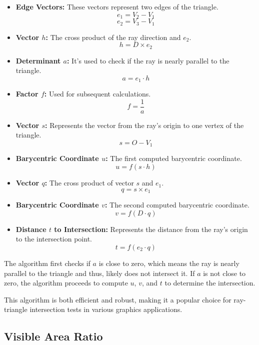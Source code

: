 \documentclass[11pt, a4paper,oneside,chapterprefix=false]{scrbook}
\begin{document}
\begin{itemize}
    \item \textbf{Edge Vectors:} These vectors represent two edges of the triangle.
	\[ e_1 = V_2 - V_1 \]
	\[ e_2 = V_3 - V_1 \]
	
    \item \textbf{Vector \( h \):} The cross product of the ray direction and \( e_2 \).
    \[ h = D \times e_2 \]
    
    \item \textbf{Determinant \( a \):} It's used to check if the ray is nearly parallel to the triangle.
    \[ a = e_1 \cdot h \]
    
    \item \textbf{Factor \( f \):} Used for subsequent calculations.
    \[ f = \frac{1}{a} \]
    
    \item \textbf{Vector \( s \):} Represents the vector from the ray's origin to one vertex of the triangle.
    \[ s = O - V_1 \]
    
    \item \textbf{Barycentric Coordinate \( u \):} The first computed barycentric coordinate.
    \[ u = f (s \cdot h) \]
    
    \item \textbf{Vector \( q \):} The cross product of vector \( s \) and \( e_1 \).
    \[ q = s \times e_1 \]
    
    \item \textbf{Barycentric Coordinate \( v \):} The second computed barycentric coordinate.
    \[ v = f (D \cdot q) \]
    
    \item \textbf{Distance \( t \) to Intersection:} Represents the distance from the ray's origin to the intersection point.
    \[ t = f (e_2 \cdot q) \]
\end{itemize}

The algorithm first checks if \( a \) is close to zero, which means the ray is nearly parallel to the triangle and thus, likely does not intersect it. If \( a \) is not close to zero, the algorithm proceeds to compute \( u \), \( v \), and \( t \) to determine the intersection.

This algorithm is both efficient and robust, making it a popular choice for ray-triangle intersection tests in various graphics applications.

\subsection{Visible Area Ratio}
\end{document}
